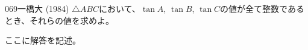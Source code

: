 \begin{prob}{069}{\maru}{一橋大 (1984)}
 $\triangle{ABC}$において、$\tan A$, $\tan B$, $\tan C$の値が全て整数であるとき、それらの値を求めよ。
\end{prob}
ここに解答を記述。